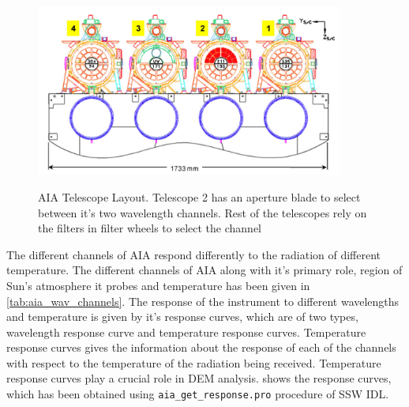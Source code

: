 \begin{figure}[h!]
    \centering
    \includegraphics[width=0.9\textwidth]{images/AIA_telescope_layout.png}
    \caption[AIA Telescope Layout]{AIA Telescope Layout. Telescope 2 has an aperture blade to select between it's two wavelength channels. Rest of the telescopes rely on the filters in filter wheels to select the channel }
    {\label{fig:aia_telescope_layout}}
\end{figure}

The different channels of AIA respond differently to the radiation of different temperature. The different channels of AIA along with it's primary role, region of Sun's atmosphere it probes and temperature has been given in \cref{tab:aia_wav_channels}. The response of the instrument to different wavelengths and temperature is given by it's response curves, which are of two types, wavelength response curve and temperature response curves. Temperature response curves gives the information about the response of each of the channels with respect to the temperature of the radiation being received. Temperature response curves play a crucial role in DEM analysis.  shows the response curves, which has been obtained using \texttt{aia\_get\_response.pro} procedure of SSW IDL.

